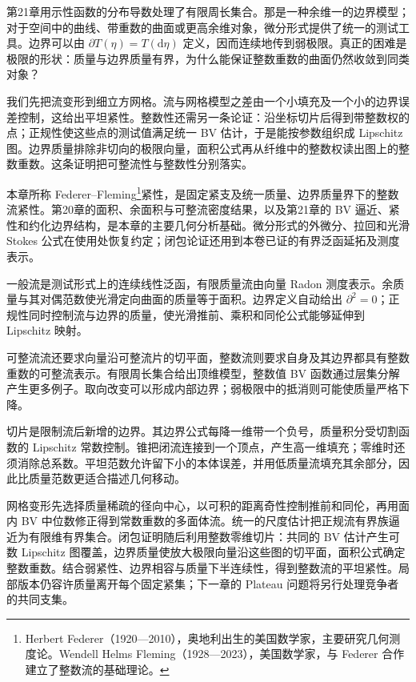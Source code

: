 \ProseParagraphBreak
第21章用示性函数的分布导数处理了有限周长集合。那是一种余维一的边界模型；对于空间中的曲线、带重数的曲面或更高余维对象，微分形式提供了统一的测试工具。边界可以由 \(\partial T(\eta)=T(\mathrm d\eta)\) 定义，因而连续地传到弱极限。真正的困难是极限的形状：质量与边界质量有界，为什么能保证整数重数的曲面仍然收敛到同类对象？

\ProseParagraphBreak
我们先把流变形到细立方网格。流与网格模型之差由一个小填充及一个小的边界误差控制，这给出平坦紧性。整数性还需另一条论证：沿坐标切片后得到带整数权的点；正规性使这些点的测试值满足统一 BV 估计，于是能按参数组织成 Lipschitz 图。边界质量排除非切向的极限向量，面积公式再从纤维中的整数权读出图上的整数重数。这条证明把可整流性与整数性分别落实。

\ProseParagraphBreak
本章所称 Federer--Fleming\footnote{Herbert Federer（1920—2010），奥地利出生的美国数学家，主要研究几何测度论。Wendell Helms Fleming（1928—2023），美国数学家，与 Federer 合作建立了整数流的基础理论。}紧性，是固定紧支及统一质量、边界质量界下的整数流紧性。第20章的面积、余面积与可整流密度结果，以及第21章的 BV 逼近、紧性和约化边界结构，是本章的主要几何分析基础。微分形式的外微分、拉回和光滑 Stokes 公式在使用处恢复约定；闭包论证还用到本卷已证的有界泛函延拓及测度表示。







\begin{chaptersummary}
	一般流是测试形式上的连续线性泛函，有限质量流由向量 Radon 测度表示。余质量与其对偶范数使光滑定向曲面的质量等于面积。边界定义自动给出 \(\partial^2=0\)；正规性同时控制流与边界的质量，使光滑推前、乘积和同伦公式能够延伸到 Lipschitz 映射。

	\ProseParagraphBreak
	可整流流还要求向量沿可整流片的切平面，整数流则要求自身及其边界都具有整数重数的可整流表示。有限周长集合给出顶维模型，整数值 BV 函数通过层集分解产生更多例子。取向改变可以形成内部边界；弱极限中的抵消则可能使质量严格下降。

	\ProseParagraphBreak
	切片是限制流后新增的边界。其边界公式每降一维带一个负号，质量积分受切割函数的 Lipschitz 常数控制。锥把闭流连接到一个顶点，产生高一维填充；零维时还须消除总系数。平坦范数允许留下小的本体误差，并用低质量流填充其余部分，因此比质量范数更适合描述几何移动。

	\ProseParagraphBreak
	网格变形先选择质量稀疏的径向中心，以可积的距离奇性控制推前和同伦，再用面内 BV 中位数修正得到常数重数的多面体流。统一的尺度估计把正规流有界族逼近为有限维有界集合。闭包证明随后利用整数零维切片：共同的 BV 估计产生可数 Lipschitz 图覆盖，边界质量使放大极限向量沿这些图的切平面，面积公式确定整数重数。结合弱紧性、边界相容与质量下半连续性，得到整数流的平坦紧性。局部版本仍容许质量离开每个固定紧集；下一章的 Plateau 问题将另行处理竞争者的共同支集。
\end{chaptersummary}


